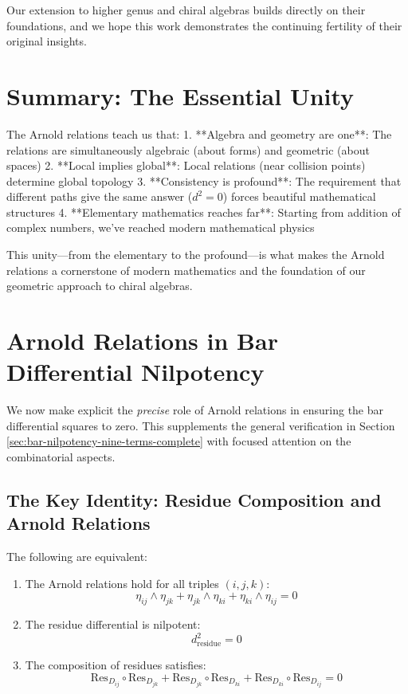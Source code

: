 Our extension to higher genus and chiral algebras builds directly on their foundations, 
and we hope this work demonstrates the continuing fertility of their original insights.

\section{Summary: The Essential Unity}

The Arnold relations teach us that:
1. **Algebra and geometry are one**: The relations are simultaneously algebraic (about forms) and geometric (about spaces)
2. **Local implies global**: Local relations (near collision points) determine global topology
3. **Consistency is profound**: The requirement that different paths give the same answer ($d^2 = 0$) forces beautiful mathematical structures
4. **Elementary mathematics reaches far**: Starting from addition of complex numbers, we've reached modern mathematical physics

This unity—from the elementary to the profound—is what makes the Arnold relations a cornerstone of modern mathematics and the foundation of our geometric approach to chiral algebras.
\section{Arnold Relations in Bar Differential Nilpotency}
\label{sec:arnold-in-bar-nilpotency}

We now make explicit the \emph{precise} role of Arnold relations in ensuring the bar
differential squares to zero. This supplements the general verification in Section
\ref{sec:bar-nilpotency-nine-terms-complete} with focused attention on the combinatorial
aspects.

\subsection{The Key Identity: Residue Composition and Arnold Relations}

\begin{theorem}[Arnold Relations $\Leftrightarrow$ $d_{\text{residue}}^2 = 0$]\label{thm:arnold-iff-nilpotent}
The following are equivalent:
\begin{enumerate}
\item The Arnold relations hold for all triples $(i,j,k)$:
$$\eta_{ij} \wedge \eta_{jk} + \eta_{jk} \wedge \eta_{ki} + \eta_{ki} \wedge \eta_{ij} = 0$$

\item The residue differential is nilpotent:
$$d_{\text{residue}}^2 = 0$$

\item The composition of residues satisfies:
$$\text{Res}_{D_{ij}} \circ \text{Res}_{D_{jk}} + \text{Res}_{D_{jk}} \circ \text{Res}_{D_{ki}}
+ \text{Res}_{D_{ki}} \circ \text{Res}_{D_{ij}} = 0$$
\end{enumerate}
\end{theorem}

